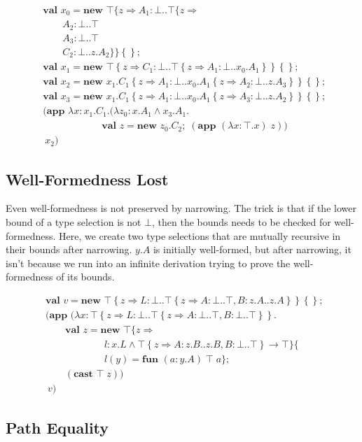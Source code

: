 \documentclass[9pt]{sigplanconf}
\newcommand{\gap}{\quad\quad}
\newcommand{\tfun}{\rightarrow}
\newcommand{\tand}{\wedge}
\newcommand{\refine}[2]{\left\{#1 \Rightarrow #2 \right\}}
\newcommand{\mlrefine}[2]{\{#1 \Rightarrow #2 \}}
\newcommand{\ldefs}[1]{\left\{#1\right\}}
\newcommand{\mlldefs}[1]{\{#1\}}
\newcommand{\abs}[3]{\lambda #1\!:\!#2.#3}
\newcommand{\new}[3]{\textbf{val }#1 = \textbf{new }#2 ;\; #3}
\newcommand{\mlnew}[3]{\textbf{val }#1 = \textbf{new }#2 ;\;\\&#3}
\newcommand{\Ldecl}[3]{#1 : #2..#3}%
\newcommand{\mdecl}[3]{#1 : #2 \tfun #3}
\newcommand{\Top}{\top}%
\newcommand{\Bot}{\bot}%
\newcommand{\fun}[4]{\textbf{fun } (#1:#2)\;#3\;#4}
\newcommand{\app}[2]{(\textbf{app }#1\;#2)}
\newcommand{\mlapp}[2]{(\textbf{app }#1\;\\&#2)}
\newcommand{\cast}[2]{(\textbf{cast }#1\;#2)}
\begin{document}
\begin{align*}
&\mlnew {x_0} {\Top \mlrefine z { \Ldecl {A_1} \Bot {\Top \mlrefine z {\\
&\gap\Ldecl {A_2} \Bot \Top\\
&\gap\Ldecl {A_3} \Bot \Top\\
&\gap\Ldecl {C_2} \Bot {z.A_2}}}}\ldefs{}}{
\mlnew {x_1} {\Top \refine z {\Ldecl {C_1} \Bot {\Top \refine z {\Ldecl {A_1} \Bot {x_0.A_1}}}}\ldefs{}}}{
\mlnew {x_2} {{x_1.C_1} \refine z {\Ldecl {A_1} \Bot {{x_0.A_1} \refine z {\Ldecl {A_2} \Bot {z.A_3}}}}\ldefs{}}}{
\mlnew {x_3} {{x_1.C_1} \refine z {\Ldecl {A_1} \Bot {{x_0.A_1} \refine z {\Ldecl {A_3} \Bot {z.A_2}}}}\ldefs{}}}{
\mlapp {\abs x {x_1.C_1} {(\abs {z_0} {x.A_1 \tand x_3.A_1} {\\&\gap\gap\gap\new z {z_0.C_2} {\app {(\abs x \Top x)} z}})}} {\ x_2}}
\end{align*}

\subsection{Well-Formedness Lost}\label{narrowing_wf}

Even well-formedness is not preserved by narrowing. The trick is that
if the lower bound of a type selection is not $\Bot$, then the
bounds needs to be checked for well-formedness. Here, we create two
type selections that are mutually recursive in their bounds
after narrowing. $y.A$ is initially well-formed, but after narrowing,
it isn't because we run into an infinite derivation trying to prove
the well-formedness of its bounds.

\begin{align*}
&\mlnew v {\Top \refine z {\Ldecl L \Bot {\Top \refine z {\Ldecl A \Bot \Top, \Ldecl B {z.A} {z.A}}}} \ldefs{}}{
\mlapp {(\abs x {\Top \refine z {\Ldecl L \Bot {\Top \refine z {\Ldecl A \Bot \Top, \Ldecl B \Bot \Top}}}} {\\&\gap
\mlnew z {\Top \mlrefine z {\\&\gap\gap\gap
\mdecl l {x.L \tand {\Top \refine z {\Ldecl A {z.B} {z.B}, \Ldecl B \Bot \Top}}} \Top}\mlldefs{\\&\gap\gap\gap
l(y) = \fun a {y.A} \Top a}}{
\gap \cast {\top} z
}})}{\ v}}
\end{align*}

\subsection{Path Equality}\label{patheq}
\end{document}
